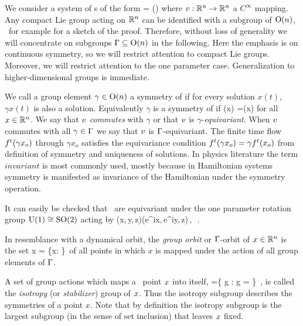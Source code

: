 

We consider a system of \ode s of the form
\beq
	\dot{\ssp} = \vf(\ssp)
	\label{eq:difeq}
\eeq
where $v: \mathbb{R}^{n} \rightarrow \mathbb{R}^{n}$ a $C^\infty$ mapping.
Any compact Lie group acting on $\mathbb{R}^{n}$ can be identified
with a subgroup of $\textrm{O}(n)$, \cf\ for example 
for a sketch of the proof. Therefore, without loss of generality
we will concentrate on subgroups $\Gamma\subseteq\textrm{O}(n)$ in the following.
Here the emphasis is on continuous symmetry, so we will restrict attention
to compact Lie groups. Moreover, we will restrict attention to the one parameter case.
Generalization to higher-dimensional groups is immediate.

We call a group element $\gamma\in\textrm{O}(n)$ a symmetry of
 if for every solution $x(t)$, $\gamma x(t)$
is also a solution. Equivalently $\gamma$ is a symmetry of  if
\beq
	\vf(\gamma x) =\gamma \vf(x)
	\label{eq:equiv}
\eeq
for all $x\in\mathbb{R}^{n}$. We say that $v$ \emph{commutes} with
$\gamma$ or that $v$ is $\gamma$-\emph{equivariant}. When
$v$ commutes with all $\gamma\in\Gamma$ we say that $v$
is $\Gamma$-equivariant. The finite time flow
${f^{t}(\gamma x_o)}$ through $\gamma x_o$ satisfies the
equivariance condition ${f^{t}(\gamma x_o)}=\gamma
{f^{t}(x_o)}$ from definition of symmetry and uniqueness of
solutions. In physics literature the term $invariant$ is most
commonly used, mostly because in Hamiltonian systems symmetry
is manifested as invariance of the Hamiltonian under the
symmetry operation.

It can easily be checked that \CLe\ are equivariant under the one parameter rotation
group $\textrm{U}(1)\cong\textrm{SO}(2)$ acting by
\beq
	(x,\,y,\,z)\mapsto (e^{i\theta}x,\,e^{i\theta}y,\,z)\,,\ \theta\in[0,2\pi]\,.
\eeq

In resemblance with a dynamical orbit, the \emph{group orbit} or $\Gamma$-orbit of $x\in\mathbb{R}^{n}$ is the set
\beq
	\Group x = \{\gamma x: \gamma\in\Group\}\,
\eeq
of all points in which $x$ is mapped under the action of all group elements of $\Gamma$.

A set of group actions which maps a \statesp\ point $x$ into itself,
\beq
\stab{\ssp} =\{ g \in \Group: g \ssp = \ssp \}
    \,,
is called the \emph{isotropy} (or \emph{stabilizer})  group of $x$.
Thus the isotropy subgroup describes the symmetries of a point $x$. Note that by
definition the isotropy subgroup is the largest subgroup (in the
sense of set inclusion) that leaves $x$ fixed.


